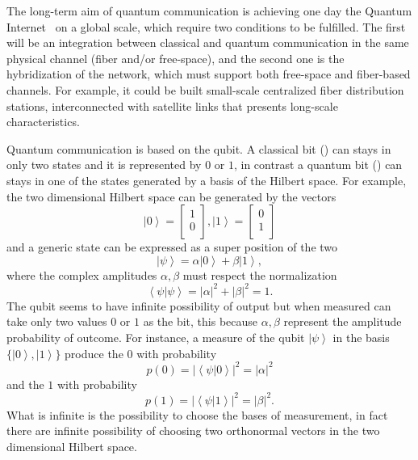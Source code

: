 The long-term aim of quantum communication is achieving one day the Quantum Internet~\cite{a19} on a global scale, which require two conditions to be fulfilled. The first will be an integration between classical and quantum communication in the same physical channel (fiber and/or free-space), and the second one is the hybridization of the network, which must support both free-space and fiber-based channels. For example, it could be built small-scale centralized fiber distribution stations, interconnected with satellite links that presents long-scale characteristics.


Quantum communication is based on the qubit. A classical bit () can stays in only two states and it is represented by $0$ or $1$, in contrast a quantum bit () can stays in one of the states generated by a basis of the Hilbert space.
For example, the two dimensional Hilbert space can be generated by the vectors
\begin{equation}
  \left|0\right> = \begin{bmatrix} 1 \\ 0 \\ \end{bmatrix}, \left|1\right> = \begin{bmatrix} 0 \\ 1 \\ \end{bmatrix}
\end{equation}
and a generic state can be expressed as a super position of the two
\begin{equation}
  \left|\psi\right> = \alpha\left|0\right> + \beta\left|1\right>,
\end{equation}
where the complex amplitudes $\alpha, \beta$ must respect the normalization
\begin{equation}
  \left<\psi|\psi\right> = |\alpha|^2 + |\beta|^2 = 1.
\end{equation}
The qubit seems to have infinite possibility of output but when measured can take only two values $0$ or $1$ as the bit, this because $\alpha, \beta$ represent the amplitude probability of outcome. For instance, a measure of the qubit $\left|\psi\right>$ in the basis $\{\left|0\right>, \left|1\right>\}$ produce the $0$ with probability
\begin{equation}
  p(0) = |\left<\psi|0\right>|^2 = |\alpha|^2
\end{equation}
and the $1$ with probability
\begin{equation}
  p(1) = |\left<\psi|1\right>|^2 = |\beta|^2.
\end{equation}
What is infinite is the possibility to choose the bases of measurement, in fact there are infinite possibility of choosing two orthonormal vectors in the two dimensional Hilbert space.

